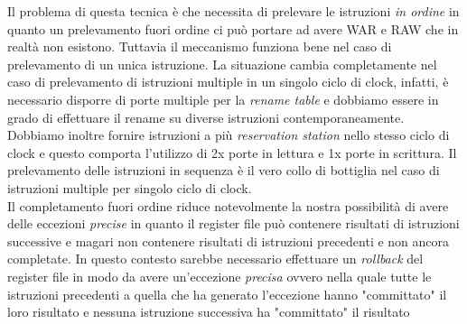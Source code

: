 Il problema di questa tecnica è che necessita di prelevare le istruzioni \emph{in ordine} in quanto un prelevamento fuori ordine ci può portare ad avere WAR e RAW che in realtà non esistono. Tuttavia il meccanismo funziona bene nel caso di prelevamento di un unica istruzione. La situazione cambia completamente nel caso di prelevamento di istruzioni multiple in un singolo ciclo di clock, infatti, è necessario disporre di porte multiple  per la \emph{rename table} e dobbiamo essere in grado di effettuare il rename su diverse istruzioni contemporaneamente. Dobbiamo inoltre fornire istruzioni a più \emph{reservation station} nello stesso ciclo di clock e questo comporta l'utilizzo di 2x porte in lettura e 1x porte in scrittura. Il prelevamento delle istruzioni in sequenza è il vero collo di bottiglia nel caso di istruzioni multiple per singolo ciclo di clock.\\
Il completamento fuori ordine riduce notevolmente la nostra possibilità di avere delle eccezioni \emph{precise} in quanto il register file può contenere risultati di istruzioni successive e magari non contenere risultati di istruzioni precedenti e non ancora completate.
In questo contesto sarebbe necessario effettuare un \emph{rollback} del register file in modo da avere un'eccezione \emph{precisa} ovvero nella quale tutte le istruzioni precedenti a quella che ha generato l'eccezione hanno "committato" il loro risultato e nessuna istruzione successiva ha "committato" il risultato
